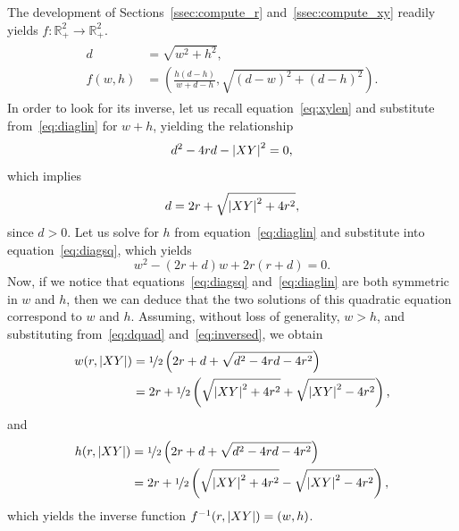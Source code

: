 The development of Sections~\ref{ssec:compute_r} and~\ref{ssec:compute_xy}
readily yields $f: \mathbb{R}_+^2 \rightarrow \mathbb{R}_+^2$.
%
\begin{align}
  \begin{split}
    d &= \sqrt{w^2 + h^2}, \\
    f(w,h) &= \left( \frac{h(d-h)}{w+d-h}, \sqrt{(d-w)^2 + (d-h)^2} \right).
  \end{split}
  \label{eq:f}
\end{align}
%
In order to look for its inverse, let us recall equation~\eqref{eq:xylen} and
substitute from~\eqref{eq:diaglin} for $w+h$, yielding the relationship 
\begin{equation} 
 d^2 - 4rd - \left|{XY}\right|^2 = 0, 
 \label{eq:dquad}
\end{equation}
%
which implies 
%
\begin{equation}
  d = 2r + \sqrt{\left|{XY}\right|^2 + 4r^2}, 
  \label{eq:inversed}
\end{equation}
%
since $d > 0$. Let us solve for $h$ from equation~\eqref{eq:diaglin} and
substitute into equation~\eqref{eq:diagsq}, which yields \[ w^2 - (2r+d)w +
2r(r+d) = 0. \] Now, if we notice that equations~\eqref{eq:diagsq}
and~\eqref{eq:diaglin} are both symmetric in $w$ and $h$, then we can deduce
that the two solutions of this quadratic equation correspond to $w$ and $h$.
Assuming, without loss of generality, $w > h$, and substituting
from~\eqref{eq:dquad} and~\eqref{eq:inversed}, we obtain 
%
\begin{align*}
  w(r,\left|{XY}\right|) &= \nicefrac{1}{2}\left(2r+d + \sqrt{d^2 - 4rd - 4r^2} \right) \\ 
    &= 2r + \nicefrac{1}{2} \left( \sqrt{\left|{XY}\right|^2 + 4r^2} + \sqrt{\left|{XY}\right|^2 -
4r^2} \right),
\end{align*}
%
and 
%
\begin{align*}
  h(r,\left|{XY}\right|) &= \nicefrac{1}{2}\left(2r+d + \sqrt{d^2 - 4rd - 4r^2} \right) \\ 
    &= 2r + \nicefrac{1}{2} \left( \sqrt{\left|{XY}\right|^2 + 4r^2} - \sqrt{\left|{XY}\right|^2 -
4r^2} \right),
\end{align*}
%
which yields the inverse function $f^{-1}(r,\left|{XY}\right|) = (w,h)$.
